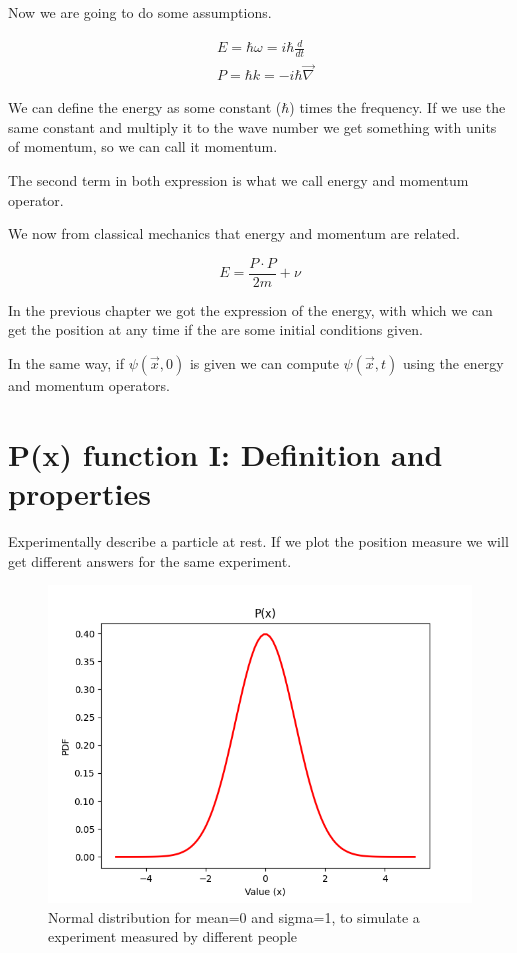 Now we are going to do some assumptions. 

\begin{equation}
    \label{Energy_Momentum}
    \begin{split}
        &E = \hbar \omega = i\hbar\frac{d}{dt}\\
        &P = \hbar k = -i\hbar\Vec{\nabla} 
    \end{split}
\end{equation}

We can define the energy as some constant ($\hbar$) times the frequency. If we use the same constant and multiply it to the wave number we get something with units of momentum, so we can call it momentum. 

The second term in both expression is what we call energy and momentum operator.  

We now from classical mechanics that energy and momentum are related.

\begin{equation}
    \label{Energy(momentum)}
    E = \frac{P\cdot P}{2m} + \nu
\end{equation}

In the previous chapter we got the expression of the energy, with which we can get the position at any time if the are some initial conditions given.

In the same way, if $\psi(\vec{x},0)$ is given we can compute $\psi(\vec{x},t)$ using the energy and momentum operators.

\section{P(x) function I: Definition and properties}

Experimentally describe a particle at rest. If we plot the position measure we will get different answers for the same experiment. 

\begin{figure}[h]
    \includegraphics{images2/PDF_function.png}
    \caption{Normal distribution for mean=0 and sigma=1, to simulate a experiment measured by different people}
    \label{PDF_function}
\end{figure}
    

